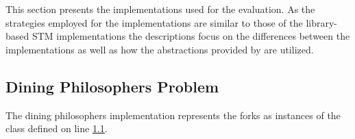 \section{\stmname}\label{app:impl_stm_lab}
This section presents the \stmname implementations used for the evaluation. As the strategies employed for the \stmname implementations are similar to those of the library-based \ac{STM} implementations the descriptions focus on the differences between the implementations as well as how the abstractions provided by \stmname are utilized.

\subsection{Dining Philosophers Problem}
The \stmname dining philosophers implementation represents the forks as instances of the  class defined on line \ref{}.


